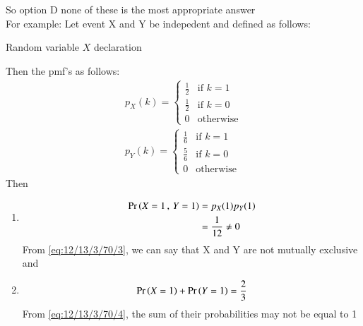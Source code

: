 \documentclass[article]{IEEEtran}
\theoremstyle{remark}
\begin{document}
So option D none of these is the most appropriate answer 
\\For example: Let event X and Y be indepedent and defined as follows:
\begin{table}[h]
	\centering
	
	\caption{Random variable $X$ declaration}
        \label{tab:exemplar/12/13/3/70}
\end{table}
Then the pmf's as follows:
\begin{align}
p_X(k) = 
\begin{cases}
  \frac{1}{2} & \text{if } k = 1 \\
  \frac{1}{2} & \text{if } k = 0 \\
  0 & \text{otherwise}
\end{cases} \\
p_Y(k) = 
\begin{cases}
  \frac{1}{6} & \text{if } k = 1 \\
  \frac{5}{6} & \text{if } k = 0 \\
  0 & \text{otherwise}
\end{cases}
\end{align}
Then
\begin{enumerate}
\item \begin{align}
\Pr\left(X=1\,,\,Y=1\right) &= p_X(1)p_Y(1) \\
&= \frac{1}{12} \neq 0 \label{eq:12/13/3/70/3}
\end{align}
From \eqref{eq:12/13/3/70/3}, we can say that X and Y are not mutually exclusive and 
\item \begin{align}
\Pr\left(X=1\right)+\Pr\left(Y=1\right) = \frac{2}{3} \label{eq:12/13/3/70/4}
\end{align}
From \eqref{eq:12/13/3/70/4}, the sum of their probabilities may not be equal to 1
\end{enumerate}
\end{document}
